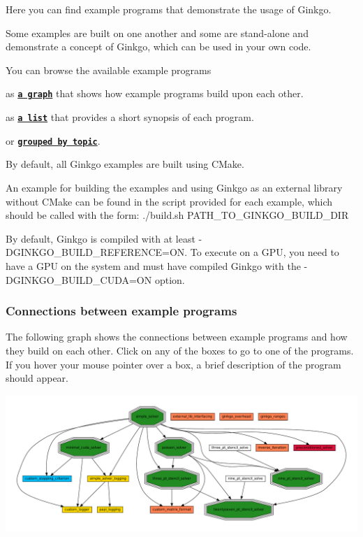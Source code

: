 Here you can find example programs that demonstrate the usage of Ginkgo.

Some examples are built on one another and some are stand-\/alone and demonstrate a concept of Ginkgo, which can be used in your own code.

You can browse the available example programs 
\begin{DoxyEnumerate}
\item as {\bfseries \href{#graph}{\tt a graph}} that shows how example programs build upon each other. 
\item as {\bfseries \href{#list}{\tt a list}} that provides a short synopsis of each program. 
\item or {\bfseries \href{#topic}{\tt grouped by topic}}. 
\end{DoxyEnumerate}

By default, all Ginkgo examples are built using C\+Make.

An example for building the examples and using Ginkgo as an external library without C\+Make can be found in the script provided for each example, which should be called with the form\+: {\ttfamily ./build.sh P\+A\+T\+H\+\_\+\+T\+O\+\_\+\+G\+I\+N\+K\+G\+O\+\_\+\+B\+U\+I\+L\+D\+\_\+\+D\+IR }

By default, Ginkgo is compiled with at least {\ttfamily -\/\+D\+G\+I\+N\+K\+G\+O\+\_\+\+B\+U\+I\+L\+D\+\_\+\+R\+E\+F\+E\+R\+E\+N\+CE=ON}. To execute on a G\+PU, you need to have a G\+PU on the system and must have compiled Ginkgo with the {\ttfamily -\/\+D\+G\+I\+N\+K\+G\+O\+\_\+\+B\+U\+I\+L\+D\+\_\+\+C\+U\+DA=ON} option.

\label{_graph}%
 \label{Examples_ExampleConnectionGraph}%
%
 \subsubsection*{Connections between example programs}

The following graph shows the connections between example programs and how they build on each other. Click on any of the boxes to go to one of the programs. If you hover your mouse pointer over a box, a brief description of the program should appear. 
\begin{DoxyImageNoCaption}
  \mbox{\includegraphics[width=\textwidth,height=\textheight/2,keepaspectratio=true]{dot_inline_dotgraph_1}}
\end{DoxyImageNoCaption}



